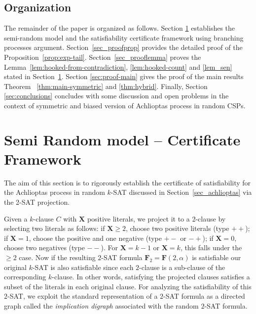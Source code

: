 \documentclass[11pt,reqno]{amsart}
\numberwithin{equation}{section}
\renewcommand{\vec}[1]{\boldsymbol{#1}}
\newcommand\vF{\vec F}
\newcommand\vX{\vec X}
\newcommand\Lem{Lemma}
\newcommand\Prop{Proposition}
\newcommand\Thm{Theorem}
\newcommand\Sec{Section}
\begin{document}
	\subsection{Organization}\label{sec_org}
	The remainder of the paper is organized as follows. 
	Section \ref{sec_model} establishes the semi-random model and the satisfiability certificate framework using branching processes argument. 
	\Sec~\ref{sec_proofprop} provides the detailed proof of the \Prop~\ref{prop:exp-tail}.
	\Sec~\ref{sec_prooflemma} proves the \Lem~\ref{lem:hooked-from-contradiction}, \ref{lem:hooked-count} and \ref{lem_sen} stated in \Sec~\ref{sec_model}.
	Section \ref{sec:proof-main} gives the proof of the main results \Thm~ \ref{thm:main-symmetric} and \ref{thm:hybrid}. 
	Finally, Section \ref{sec:conclusions} concludes with some discussion and open problems in the context of symmetric and biased version of Achlioptas process in random CSPs.
	
	\section{Semi Random model -- Certificate Framework}\label{sec_model}
	The aim of this section is to rigorously establish the certificate of satisfiability for the Achlioptas process in random $k$-SAT discussed in Section~\ref{sec_achlioptas} via the 2-SAT projection.
	 
	Given a $k$-clause $C$ with $\vX$ positive literals, we project it to a 2-clause by selecting two literals as follows: if $\vX \ge 2$, choose two positive literals (type $++$); if $\vX = 1$, choose the positive and one negative (type $+-$ or $-+$); if $\vX = 0$, choose two negatives (type $--$). For $\vX = k-1$ or $\vX = k$, this falls under the $\ge 2$ case.
	Now if the resulting $2$-SAT formula $\vF_2=\vF(2,\alpha)$ is satisfiable our original $k$-SAT is also satisfiable since each $2$-clause is a sub-clause of the corresponding $k$-clause. In other words, satisfying the projected clauses satisfies a subset of the literals in each original clause.
	For analyzing the satisfiability of this $2$-SAT, we exploit the standard representation of a $2$-SAT formula as a directed graph called the \emph{implication digraph} \cite{BBCKW} associated with the random $2$-SAT formula.	
	
\end{document}
